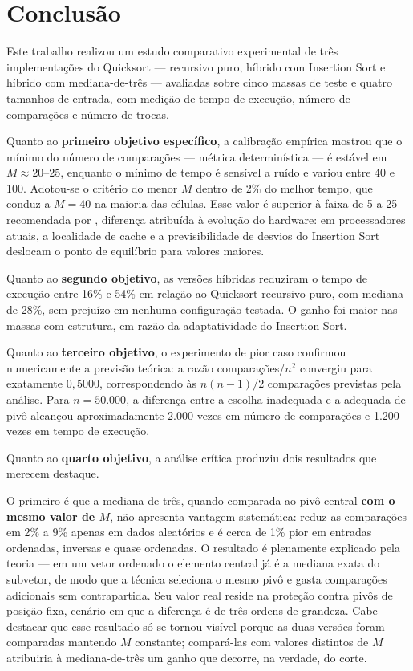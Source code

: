\chapter{Conclusão}
\label{cap:conclusao}

Este trabalho realizou um estudo comparativo experimental de três implementações do
Quicksort --- recursivo puro, híbrido com Insertion Sort e híbrido com
mediana-de-três --- avaliadas sobre cinco massas de teste e quatro tamanhos de
entrada, com medição de tempo de execução, número de comparações e número de trocas.

Quanto ao \textbf{primeiro objetivo específico}, a calibração empírica mostrou que o
mínimo do número de comparações --- métrica determinística --- é estável em
$M \approx 20$--$25$, enquanto o mínimo de tempo é sensível a ruído e variou entre 40
e 100. Adotou-se o critério do menor $M$ dentro de 2\% do melhor tempo, que conduz a
$M = 40$ na maioria das células. Esse valor é superior à faixa de 5 a 25 recomendada
por , diferença atribuída à evolução do hardware: em
processadores atuais, a localidade de cache e a previsibilidade de desvios do
Insertion Sort deslocam o ponto de equilíbrio para valores maiores.

Quanto ao \textbf{segundo objetivo}, as versões híbridas reduziram o tempo de
execução entre 16\% e 54\% em relação ao Quicksort recursivo puro, com mediana de
28\%, sem prejuízo em nenhuma configuração testada. O ganho foi maior nas massas com
estrutura, em razão da adaptatividade do Insertion Sort.

Quanto ao \textbf{terceiro objetivo}, o experimento de pior caso confirmou
numericamente a previsão teórica: a razão comparações/$n^2$ convergiu para exatamente
$0{,}5000$, correspondendo às $n(n-1)/2$ comparações previstas pela análise. Para
$n = 50.000$, a diferença entre a escolha inadequada e a adequada de pivô alcançou
aproximadamente 2.000 vezes em número de comparações e 1.200 vezes em tempo de
execução.

Quanto ao \textbf{quarto objetivo}, a análise crítica produziu dois resultados que
merecem destaque.

O primeiro é que a mediana-de-três, quando comparada ao pivô central \textbf{com o
mesmo valor de $M$}, não apresenta vantagem sistemática: reduz as comparações em 2\%
a 9\% apenas em dados aleatórios e é cerca de 1\% pior em entradas ordenadas,
inversas e quase ordenadas. O resultado é plenamente explicado pela teoria --- em um
vetor ordenado o elemento central já é a mediana exata do subvetor, de modo que a
técnica seleciona o mesmo pivô e gasta comparações adicionais sem contrapartida. Seu
valor real reside na proteção contra pivôs de posição fixa, cenário em que a
diferença é de três ordens de grandeza. Cabe destacar que esse resultado só se
tornou visível porque as duas versões foram comparadas mantendo $M$ constante;
compará-las com valores distintos de $M$ atribuiria à mediana-de-três um ganho que
decorre, na verdade, do corte.

